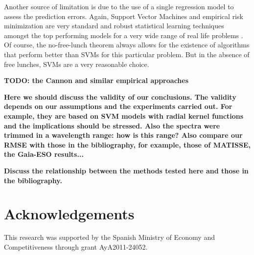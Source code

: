 \documentclass[a4paper,fleqn,usenatbib]{mnras}
\begin{document}
{{{Another source of limitation is due to the use of a single regression model to 
assess the prediction errors. Again, Support Vector Machines and empirical 
risk minimization are very standard and robust statistical learning techniques 
amongst the top performing models for a very wide range of real life problems 
\citep{vanGestel2004}. Of course, the no-free-lunch theorem \citep[see][and 
references therein for a formal statement of the theorem]{Igel2005} always 
allows for the existence of algorithms that perform better than SVMs for this 
particular problem. But in the absence of free lunches, SVMs are a very reasonable choice.

{\bf TODO: the Cannon and similar empirical approaches}


{\bf Here we should discuss the validity of our conclusions. The
  validity depends on our assumptions and the experiments carried
  out. For example, they are based on SVM models with radial kernel
  functions and the implications should be stressed. Also the spectra
  were trimmed in a wavelength range: how is this range? Also compare
  our RMSE with those in the bibliography, for example, those of
  MATISSE, the Gaia-ESO results...}

{\bf Discuss the relationship between the methods tested here and
  those in the bibliography.}

\section*{Acknowledgements}
This research was supported by the Spanish Ministry of Economy and
Competitiveness through grant AyA2011-24052.










\appendix

}}}
\end{document}

